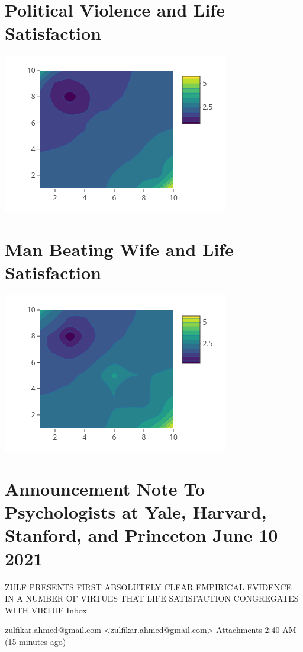 \documentclass{amsart}
\begin{document}
\section{Political Violence and Life Satisfaction}

\includegraphics[scale=1.0]{polviol_lifesat.png}

\section{Man Beating Wife and Life Satisfaction}

\includegraphics[scale=1.0]{beatwife_lifesat.png}


\section{Announcement Note To Psychologists at Yale, Harvard, Stanford, and Princeton June 10 2021}

ZULF PRESENTS FIRST ABSOLUTELY CLEAR EMPIRICAL EVIDENCE IN A NUMBER OF VIRTUES THAT LIFE SATISFACTION CONGREGATES WITH VIRTUE
Inbox

zulfikar.ahmed@gmail.com <zulfikar.ahmed@gmail.com>
Attachments
2:40 AM (15 minutes ago)
\end{document}
